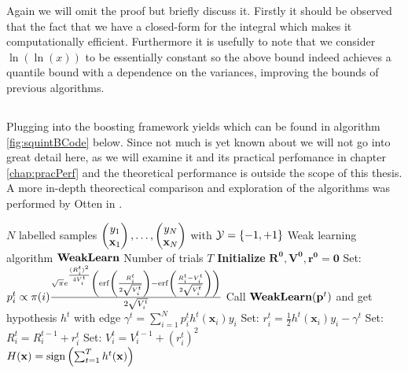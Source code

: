  Again we will omit the proof but briefly discuss it. Firstly it should be observed that the fact that we have a closed-form for the integral which makes it computationally efficient. Furthermore it is usefully to note that we consider $\ln(\ln(x))$ to be essentially constant so the above bound indeed achieves a quantile bound with a dependence on the variances, improving the bounds of previous algorithms.

\subsection{\squintB}
\label{subsec:algoSquintB}
Plugging \squint into the boosting framework yields \squintB which can be found in algorithm \ref{fig:squintBCode} below. Since not much is yet known about \squintB we will not go into great detail here, as we will examine it and its practical perfomance in chapter \ref{chap:pracPerf} and the theoretical performance is outside the scope of this thesis. A more in-depth theorectical comparison and exploration of the algorithms was performed by Otten in \cite{Otten2016}. 
\begin{algorithm} 
\caption{\squintB}
\label{fig:squintBCode}
\begin{algorithmic}[1]
\Require 
\Statex $N$ labelled samples $\Vec{y_1\\ \mathbf x_1},\ldots,\Vec{y_N\\ \mathbf x_N}$  with $\mathcal Y = \set{-1,+1}$ 
\Statex Weak learning algorithm $\weak$
\Statex Number of trials $T$
\Procedure{\squintB}{}
\State \textbf{Initialize} $\mathbf{R^0,V^0,r^0} = \mathbf 0$
\State Set: $ p_i^t \propto \pi(i) \frac{\sqrt{\pi}e^{\frac{(R^t_i)^2}{4V^t_i}}\lubke{\erf\lubke{\frac{R^t_i}{2\sqrt{V_i^t}}}-\erf\lubke{\frac{R_i^t-V_i^t}{2\sqrt{V_i^t}}}}}{2\sqrt{V_i^t}} $ 
\State Call $\weak(\mathbf p^t)$ and get hypothesis $h^t$ with edge $\gamma^t = \sum_{i=1}^N p^t_ih^t(\mathbf x_i)y_i$
\State Set: $r_i^t=\frac12h^t(\mathbf x_i)y_i-\gamma^t$ 
\State Set: $R_i^t = R_i^{t-1} + r_i^t $ 
\State Set: $V_i^t = V_i^{t-1} + (r_i^t)^2$
\EndFor\\
\Return $H(\mathbf x) = \sign\lubke{\sum^T_{t=1}h^t(\mathbf{x})}$
\EndProcedure
\end{algorithmic}
\end{algorithm}